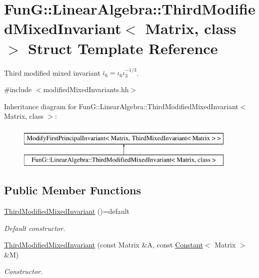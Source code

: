 \hypertarget{structFunG_1_1LinearAlgebra_1_1ThirdModifiedMixedInvariant}{\section{Fun\-G\-:\-:Linear\-Algebra\-:\-:Third\-Modified\-Mixed\-Invariant$<$ Matrix, class $>$ Struct Template Reference}
\label{structFunG_1_1LinearAlgebra_1_1ThirdModifiedMixedInvariant}
}


Third modified mixed invariant $\bar\iota_6=\iota_6\iota_3^{-1/3}$.  




{\ttfamily \#include $<$modified\-Mixed\-Invariants.\-hh$>$}

Inheritance diagram for Fun\-G\-:\-:Linear\-Algebra\-:\-:Third\-Modified\-Mixed\-Invariant$<$ Matrix, class $>$\-:\begin{figure}[H]
\begin{center}
\leavevmode
\includegraphics[height=2.000000cm]{structFunG_1_1LinearAlgebra_1_1ThirdModifiedMixedInvariant}
\end{center}
\end{figure}
\subsection*{Public Member Functions}
\begin{DoxyCompactItemize}
\item 
\hypertarget{structFunG_1_1LinearAlgebra_1_1ThirdModifiedMixedInvariant_a44fcdc90fe9fa76e7f803da8d07e57aa}{\hyperlink{structFunG_1_1LinearAlgebra_1_1ThirdModifiedMixedInvariant_a44fcdc90fe9fa76e7f803da8d07e57aa}{Third\-Modified\-Mixed\-Invariant} ()=default}\label{structFunG_1_1LinearAlgebra_1_1ThirdModifiedMixedInvariant_a44fcdc90fe9fa76e7f803da8d07e57aa}

\begin{DoxyCompactList}\small\item\em Default constructor. \end{DoxyCompactList}\item 
\hyperlink{structFunG_1_1LinearAlgebra_1_1ThirdModifiedMixedInvariant_ad52e10528d4d2197dd3a09ec42e9d1f0}{Third\-Modified\-Mixed\-Invariant} (const Matrix \&A, const \hyperlink{structFunG_1_1Constant}{Constant}$<$ Matrix $>$ \&M)
\begin{DoxyCompactList}\small\item\em Constructor. \end{DoxyCompactList}\end{DoxyCompactItemize}


